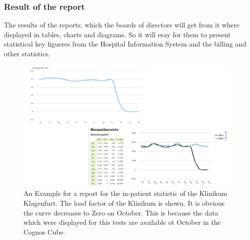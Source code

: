 \documentclass[a4paper]{article}
\begin{document}
	\subsubsection{Result of the report}
	The results of the reports, which the boards of directors will get from it
	where displayed in tables, charts and diagrams. So it will esay for them to
	present statistical key figueres from the Hospital Information System and the
	billing and other statistics.
	\begin{figure}[!ht]
		  \centering
		      \includegraphics[width=1.0\textwidth]{reports_results}
		  \caption{An Example for a report for the in-patient statistic of the
		  Klinikum Klagenfurt. The load factor of the Klinikum is shown. It is
		  obvious the curve decreases to Zero on October. This is because the data
		  which were displayed for this tests are available ot October in the Cognos
		  Cube.}
	\end{figure}
\end{document}
